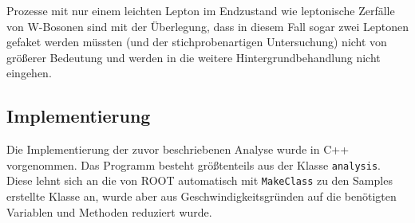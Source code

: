 Prozesse mit nur einem leichten Lepton im Endzustand wie leptonische Zerfälle
von W-Bosonen sind mit der Überlegung, dass in diesem Fall sogar zwei Leptonen
gefaket werden müssten (und der stichprobenartigen Untersuchung) nicht von
größerer Bedeutung und werden in die weitere Hintergrundbehandlung nicht
eingehen.

\subsection{Implementierung}
Die Implementierung der zuvor beschriebenen Analyse wurde in C++ vorgenommen.
Das Programm besteht größtenteils aus der Klasse \lstinline!analysis!. Diese
lehnt sich an die von ROOT automatisch mit \lstinline!MakeClass! zu den Samples
erstellte Klasse an, wurde aber aus Geschwindigkeitsgründen auf die benötigten
Variablen und Methoden reduziert wurde.

